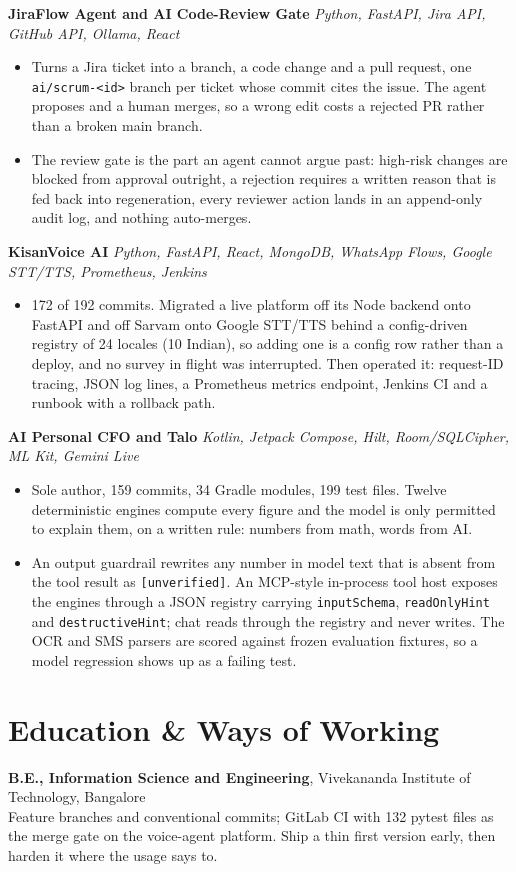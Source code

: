\documentclass[10pt,a4paper]{article}
\begin{document}
\textbf{JiraFlow Agent and AI Code-Review Gate} \textit{Python, FastAPI, Jira API, GitHub API, Ollama, React}
\begin{itemize}
  \item Turns a Jira ticket into a branch, a code change and a pull request, one
        \texttt{ai/scrum-<id>} branch per ticket whose commit cites the issue. The agent proposes and
        a human merges, so a wrong edit costs a rejected PR rather than a broken main branch.
  \item The review gate is the part an agent cannot argue past: high-risk changes are blocked from
        approval outright, a rejection requires a written reason that is fed back into regeneration,
        every reviewer action lands in an append-only audit log, and nothing auto-merges.
\end{itemize}

\vspace{1pt}
\textbf{KisanVoice AI} \textit{Python, FastAPI, React, MongoDB, WhatsApp Flows, Google STT/TTS, Prometheus, Jenkins}
\begin{itemize}
  \item 172 of 192 commits. Migrated a live platform off its Node backend onto FastAPI and off Sarvam
        onto Google STT/TTS behind a config-driven registry of 24 locales (10 Indian), so adding one
        is a config row rather than a deploy, and no survey in flight was interrupted. Then operated
        it: request-ID tracing, JSON log lines, a Prometheus metrics endpoint, Jenkins CI and a
        runbook with a rollback path.
\end{itemize}

\vspace{1pt}
\textbf{AI Personal CFO and Talo} \textit{Kotlin, Jetpack Compose, Hilt, Room/SQLCipher, ML Kit, Gemini Live}
\begin{itemize}
  \item Sole author, 159 commits, 34 Gradle modules, 199 test files. Twelve deterministic engines
        compute every figure and the model is only permitted to explain them, on a written rule:
        numbers from math, words from AI.
  \item An output guardrail rewrites any number in model text that is absent from the tool result as
        \texttt{[unverified]}. An MCP-style in-process tool host exposes the engines through a JSON
        registry carrying \texttt{inputSchema}, \texttt{readOnlyHint} and \texttt{destructiveHint};
        chat reads through the registry and never writes. The OCR and SMS parsers are scored against
        frozen evaluation fixtures, so a model regression shows up as a failing test.
\end{itemize}

\section{Education \& Ways of Working}
\textbf{B.E., Information Science and Engineering}, Vivekananda Institute of Technology, Bangalore\\
Feature branches and conventional commits; GitLab CI with 132 pytest files as the merge gate on the
voice-agent platform. Ship a thin first version early, then harden it where the usage says to.
\end{document}
